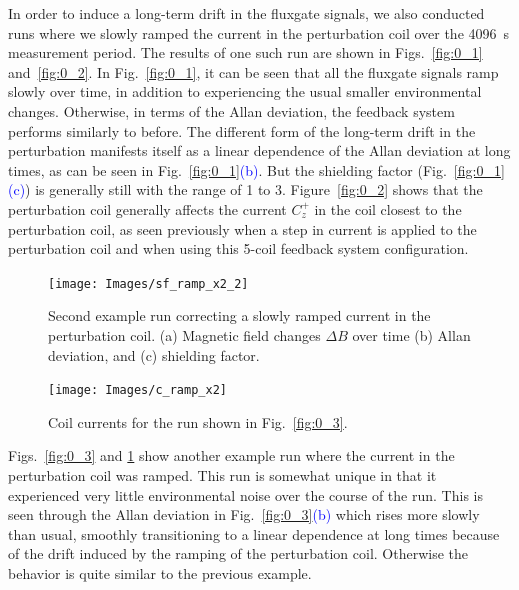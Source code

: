 In order to induce a long-term drift in the fluxgate signals, we also
conducted runs where we slowly ramped the current in the perturbation
coil over the 4096~s measurement period.  The results of one such run
are shown in Figs.~\ref{fig:0_1} and~\ref{fig:0_2}.  In
Fig.~\ref{fig:0_1}, it can be seen that all the fluxgate signals ramp
slowly over time, in addition to experiencing the usual smaller
environmental changes.  Otherwise, in terms of the Allan deviation,
the feedback system performs similarly to before.  The different form
of the long-term drift in the perturbation manifests itself as a
linear dependence of the Allan deviation at long times, as can be seen
in Fig.~\ref{fig:0_1}\textcolor{blue}{(b)}.  But the shielding factor
(Fig.~\ref{fig:0_1}\textcolor{blue}{(c)}) is generally still with the range of 1 to 3.
Figure~\ref{fig:0_2} shows that the perturbation coil generally
affects the current $C_z^+$ in the coil closest to the perturbation
coil, as seen previously when a step in current is applied to the
perturbation coil and when using this 5-coil feedback system
configuration.

\begin{figure}
\centering
        \texttt{[image: Images/sf\_ramp\_x2\_2]} \caption[Second
        example run correcting a slowly ramped current in the
        perturbation coil.]{Second
        example run correcting a slowly ramped current in the
        perturbation coil.  (a) Magnetic field changes $\Delta B$ over
        time (b) Allan deviation, and (c) shielding
        factor.}  \label{fig:0_3}
        \texttt{[image: Images/c\_ramp\_x2]} \caption{Coil
        currents for the run shown in
        Fig.~\ref{fig:0_3}.}  \label{fig:0_4}
\end{figure}

Figs.~\ref{fig:0_3} and \ref{fig:0_4} show another example run where
the current in the perturbation coil was ramped.  This run is somewhat
unique in that it experienced very little environmental noise over the
course of the run.  This is seen through the Allan deviation in
Fig.~\ref{fig:0_3}\textcolor{blue}{(b)} which rises more slowly than usual, smoothly
transitioning to a linear dependence at long times because of the
drift induced by the ramping of the perturbation coil.  Otherwise the
behavior is quite similar to the previous example.


